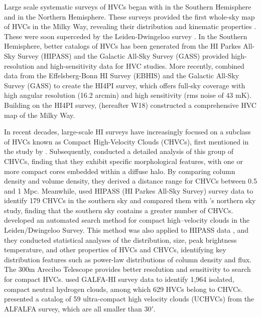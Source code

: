 \documentclass[twocolumn,trackchanges]{aastex701}
\begin{document}
Large scale systematic surveys of HVCs began with \citet{1985ApJS...58..143B} in the Southern Hemisphere and \citet{1988A&AS...75..191H} in the Northern Hemisphere. These surveys provided the first whole-sky map of HVCs in the Milky Way, revealing their distribution and kinematic properties \citep{1991A&A...250..509W}. These were soon superceded by the Leiden-Dwingeloo survey \citep{1997agnh.book.....H}. In the Southern Hemisphere, better catalogs of HVCs has been generated from the HI Parkes All-Sky Survey (HIPASS) \citep{2002AJ....123..873P} and the Galactic All-Sky Survey (GASS) \citep{2013ApJS..209...12M} provided high-resolution and high-sensitivity data for HVC studies. More recently, \citet{2016A&A...594A.116H} combined data from the Effelsberg-Bonn HI Survey (EBHIS) and the Galactic All-Sky Survey (GASS) to create the HI4PI survey, which offers full-sky coverage with high angular resolution (16.2 arcmin) and high sensitivity (rms noise of 43 mK). Building on the HI4PI survey, \citet{2018MNRAS.474..289W} (hereafter W18) constructed a comprehensive HVC map of the Milky Way.

In recent decades, large-scale HI surveys have increasingly focused on a subclass of HVCs known as Compact High-Velocity Clouds (CHVCs), first mentioned in the study by \citet{1999A&A...341..437B}. Subsequently, \citet{2000A&A...354..853B} conducted a detailed analysis of this group of CHVCs, finding that they exhibit specific morphological features, with one or more compact cores embedded within a diffuse halo. By comparing column density and volume density, they derived a distance range for CHVCs between 0.5 and 1 Mpc. Meanwhile, \citet{2000A&A...354..853B} used HIPASS (HI Parkes All-Sky Survey) survey data to identify 179 CHVCs in the southern sky and compared them with \citet{1999A&A...341..437B}'s northern sky study, finding that the southern sky contains a greater number of CHVCs. \citet{2002A&A...391..159D} developed an automated search method for compact high–velocity clouds in the Leiden/Dwingeloo Survey. This method was also applied to HIPASS data \citep{2002AJ....123..873P}, and they conducted statistical analyses of the distribution, size, peak brightness temperature, and other properties of HVCs and CHVCs, identifying key distribution features such as power-law distributions of column density and flux. The 300m Arecibo Telescope provides better resolution and sensitivity to search for compact HVCs. \citet{2012ApJ...758...44S} used GALFA-HI survey data to identify 1,964 isolated, compact neutral hydrogen clouds, among which 629 HVCs belong to CHVCs. \citet{2013ApJ...768...77A} presented a catalog of 59 ultra-compact high velocity clouds (UCHVCs) from the ALFALFA survey, which are all smaller than $30'$.
\end{document}
